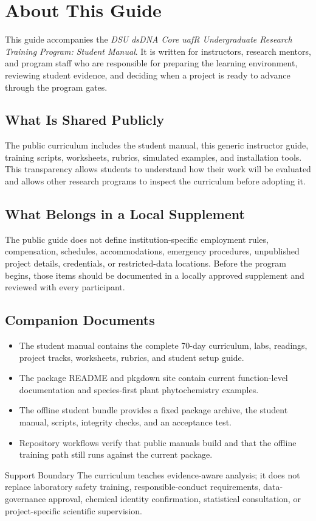 \chapter*{About This Guide}

This guide accompanies the \emph{DSU dsDNA Core uafR Undergraduate Research
Training Program: Student Manual}. It is written for instructors, research
mentors, and program staff who are responsible for preparing the learning
environment, reviewing student evidence, and deciding when a project is ready
to advance through the program gates.

\section*{What Is Shared Publicly}
The public curriculum includes the student manual, this generic instructor
guide, training scripts, worksheets, rubrics, simulated examples, and
installation tools. This transparency allows students to understand how their
work will be evaluated and allows other research programs to inspect the
curriculum before adopting it.

\section*{What Belongs in a Local Supplement}
The public guide does not define institution-specific employment rules,
compensation, schedules, accommodations, emergency procedures, unpublished
project details, credentials, or restricted-data locations. Before the program
begins, those items should be documented in a locally approved supplement and
reviewed with every participant.

\section*{Companion Documents}
\begin{itemize}
  \item The student manual contains the complete 70-day curriculum, labs,
        readings, project tracks, worksheets, rubrics, and student setup guide.
  \item The package README and pkgdown site contain current function-level
        documentation and species-first plant phytochemistry examples.
  \item The offline student bundle provides a fixed package archive, the student
        manual, scripts, integrity checks, and an acceptance test.
  \item Repository workflows verify that public manuals build and that the
        offline training path still runs against the current package.
\end{itemize}

\begin{goldbox}{Support Boundary}
The curriculum teaches evidence-aware analysis; it does not replace laboratory
safety training, responsible-conduct requirements, data-governance approval,
chemical identity confirmation, statistical consultation, or project-specific
scientific supervision.
\end{goldbox}
